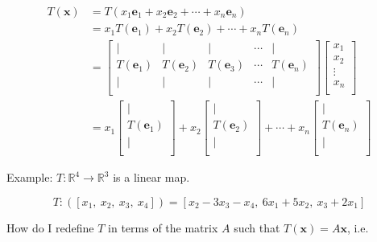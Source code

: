 \documentclass[
]{article}
\begin{document}
\begin{align*}
T\left( \mathbf{x} \right) &= T\left( x_{1}{\mathbf{e}}_{1} + x_{2}{\mathbf{e}}_{2} + \cdots + x_{n}{\mathbf{e}}_{n} \right)
 \\
&= x_{1}T\left( {\mathbf{e}}_{1} \right) + x_{2}T\left( {\mathbf{e}}_{2} \right) + \cdots + x_{n}T\left( {\mathbf{e}}_{n} \right)
 \\
&= \begin{bmatrix}
 \mid & \mid & \mid & \cdots & \mid \\
T\left( {\mathbf{e}}_{1} \right) & T\left( {\mathbf{e}}_{2} \right) & T\left( {\mathbf{e}}_{3} \right) & \cdots & T\left( {\mathbf{e}}_{n} \right) \\
 \mid & \mid & \mid & \cdots & \mid \\
\end{bmatrix}\begin{bmatrix}
x_{1} \\
x_{2} \\
 \vdots \\
x_{n} \\
\end{bmatrix}
 \\
&= x_{1}\begin{bmatrix}
 \mid \\
T\left( {\mathbf{e}}_{1} \right) \\
 \mid \\
\end{bmatrix} + x_{2}\begin{bmatrix}
 \mid \\
T\left( {\mathbf{e}}_{2} \right) \\
 \mid \\
\end{bmatrix} + \cdots + x_{n}\begin{bmatrix}
 \mid \\
T\left( {\mathbf{e}}_{n} \right) \\
 \mid \\
\end{bmatrix}
\end{align*}


Example: $T:\mathbb{R}^{4} \rightarrow \mathbb{R}^{3}$ is a linear
map.

$$T:\left( \left\lbrack x_{1},\ x_{2},\ x_{3},\ x_{4} \right\rbrack \right) = \left\lbrack x_{2} - 3x_{3} - x_{4},\ 6x_{1} + 5x_{2},\ x_{3} + 2x_{1} \right\rbrack$$

How do I redefine $T$ in terms of the matrix $A$ such that
$T\left( \mathbf{x} \right) = A\mathbf{x}$, i.e.
\end{document}
